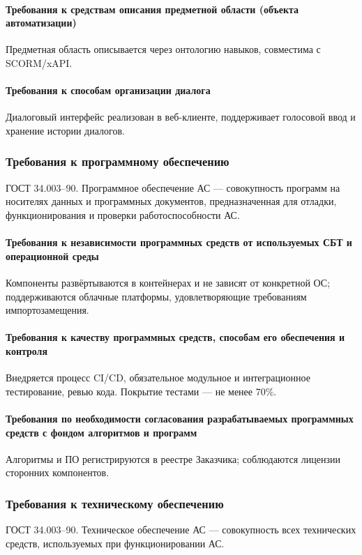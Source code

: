 \documentclass[14pt,a4paper]{extarticle}
\begin{document}
\paragraph{Требования к средствам описания предметной области (объекта автоматизации)} Предметная область описывается через онтологию навыков, совместима с SCORM/xAPI.
\paragraph{Требования к способам организации диалога} Диалоговый интерфейс реализован в веб-клиенте, поддерживает голосовой ввод и хранение истории диалогов.

\subsubsection{Требования к программному обеспечению}
ГОСТ 34.003–90. Программное обеспечение АС — совокупность программ на носителях данных и программных документов, предназначенная для отладки, функционирования и проверки работоспособности АС.
\paragraph{Требования к независимости программных средств от используемых СБТ и операционной среды} Компоненты развёртываются в контейнерах и не зависят от конкретной ОС; поддерживаются облачные платформы, удовлетворяющие требованиям импортозамещения.
\paragraph{Требования к качеству программных средств, способам его обеспечения и контроля} Внедряется процесс CI/CD, обязательное модульное и интеграционное тестирование, ревью кода. Покрытие тестами — не менее 70\%.
\paragraph{Требования по необходимости согласования разрабатываемых программных средств с фондом алгоритмов и программ} Алгоритмы и ПО регистрируются в реестре Заказчика; соблюдаются лицензии сторонних компонентов.

\subsubsection{Требования к техническому обеспечению}
ГОСТ 34.003–90. Техническое обеспечение АС — совокупность всех технических средств, используемых при функционировании АС.
\end{document}
